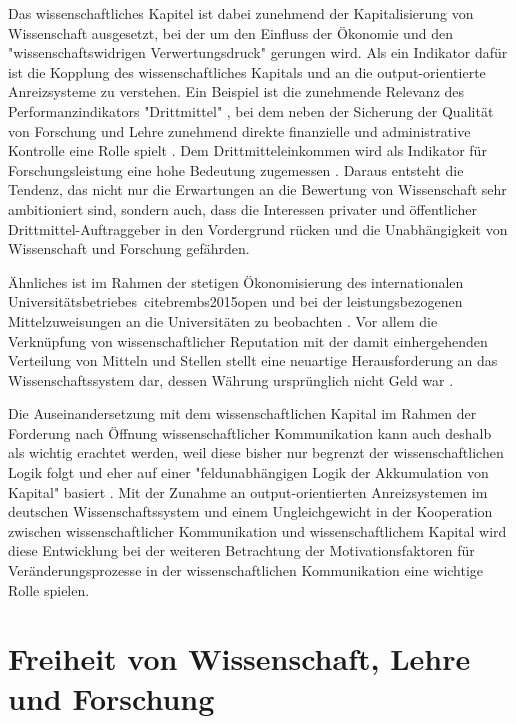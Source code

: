 Das wissenschaftliches Kapitel ist dabei zunehmend der Kapitalisierung von Wissenschaft ausgesetzt, bei der um den Einfluss der Ökonomie und den "wissenschaftswidrigen Verwertungsdruck"  \cite[:12]{Neidhardt_2006} gerungen wird. Als ein Indikator dafür ist die Kopplung des wissenschaftliches Kapitals und an die output-orientierte Anreizsysteme zu verstehen. Ein Beispiel ist die zunehmende Relevanz des Performanzindikators "Drittmittel" \cite{Fabrizio_2008} \cite{Jansen_2007}, bei dem neben der Sicherung der Qualität von Forschung und Lehre zunehmend direkte finanzielle und administrative Kontrolle eine Rolle spielt \cite{Barl_sius_2008}. Dem Drittmitteleinkommen wird als Indikator für Forschungsleistung eine hohe Bedeutung zugemessen \cite{Jansen_2007}. Daraus entsteht die Tendenz, das nicht nur die Erwartungen an die Bewertung von Wissenschaft sehr ambitioniert sind, sondern auch, dass die Interessen privater und öffentlicher Drittmittel-Auftraggeber in den Vordergrund rücken und die Unabhängigkeit von Wissenschaft und Forschung gefährden.

Ähnliches ist im Rahmen der stetigen Ökonomisierung des internationalen Universitätsbetriebes\ cite{brembs2015open} und bei der leistungsbezogenen Mittelzuweisungen an die Universitäten zu beobachten \cite[:12]{Neidhardt_2006}. Vor allem die Verknüpfung von wissenschaftlicher Reputation mit der damit einhergehenden Verteilung von Mitteln und Stellen stellt eine neuartige Herausforderung an das Wissenschaftssystem dar, dessen Währung ursprünglich nicht Geld war \cite{hanekop_2006}.

Die Auseinandersetzung mit dem wissenschaftlichen Kapital im Rahmen der Forderung nach Öffnung wissenschaftlicher Kommunikation kann auch deshalb als wichtig erachtet werden, weil diese bisher nur begrenzt der wissenschaftlichen Logik folgt und eher auf einer "feldunabhängigen Logik der Akkumulation von Kapital" basiert \cite{herb_2006}. Mit der Zunahme an output-orientierten Anreizsystemen im deutschen Wissenschaftssystem \cite{osterloh2008anreize} und einem Ungleichgewicht in der Kooperation zwischen wissenschaftlicher Kommunikation und wissenschaftlichem Kapital wird diese Entwicklung bei der weiteren Betrachtung der Motivationsfaktoren für Veränderungsprozesse in der wissenschaftlichen Kommunikation eine wichtige Rolle spielen.

\section{Freiheit von Wissenschaft, Lehre und Forschung}

